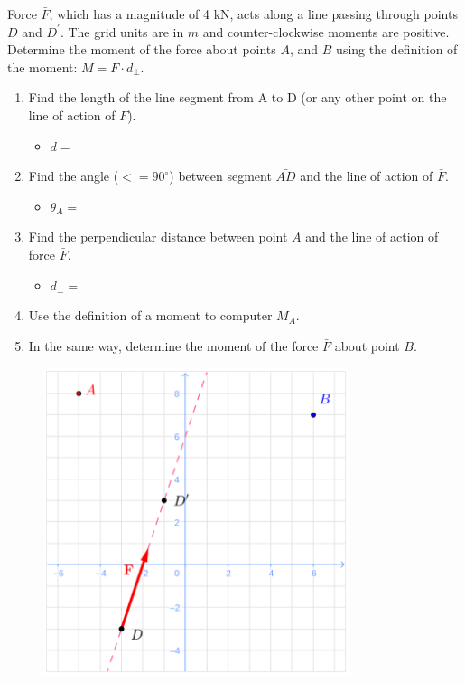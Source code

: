 
Force $\bar{F}$, which has a magnitude of 4 kN, acts along a line passing through points $D$ and $D^\prime$.   The grid units are in $m$ and counter-clockwise moments are positive.  Determine the moment of the force about points $A$, and $B$ using the definition of the moment: $M = F \cdot d_{\perp}$.

\begin{enumerate}
  \item Find the length of the line segment from A to D (or any other point on the line of action of $\bar{F}$).
  \begin{itemize}\item $d = $\end{itemize}
  \item Find the angle ($<= 90^\circ$) between segment $\bar{AD}$ and the line of action of $\bar{F}$.
  \begin{itemize}\item$\theta_A = $\end{itemize}
  \item Find the perpendicular distance between point $A$ and the line of action of force $\bar{F}$.
  \begin{itemize}\item$d_{\perp} = $ \end{itemize}
  \item Use the definition of a moment to computer $M_A$.
  \item In the same way, determine the moment of the force $\bar{F}$ about point $B$.
\end{enumerate}

\begin{figure}[ht!]
  \centering
  \includegraphics[width=0.8\textwidth,height=0.5\textheight,keepaspectratio]{fig.png}
\end{figure}

